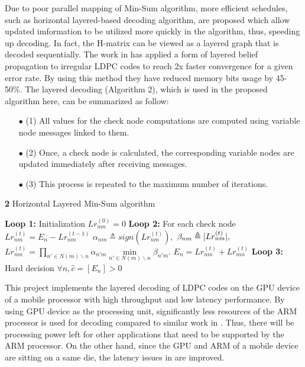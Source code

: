 \documentclass[10pt,a4paper]{article}
\DeclarePairedDelimiter\abs{\lvert}{\rvert}%
\begin{document}
Due to poor parallel mapping of Min-Sum algorithm, more efficient schedules, such as horizontal layered-based decoding algorithm, are proposed which allow updated imformation to be utilized more quickly in the algorithm, thus, speeding up decoding\cite{art_layered0, art_layered1}. In fact, the H-matrix can be viewed as a layered graph that is decoded sequentially. The work in \cite{art_gpu_0} has applied a form of layered belief propagation to irregular LDPC codes to reach 2x faster convergence for a given error rate. By using this method they have reduced memory bits usage by 45-50\%. The layered decoding (Algorithm 2), which is used in the proposed algorithm here, can be summarized as follow:
\begin{enumerate}
\item[$\bullet$] (1) All values for the check node computations are computed using variable node messages linked to them.
\item[$\bullet$] (2) Once, a check node is calculated, the corresponding variable nodes are updated immediately after receiving messages.
\item[$\bullet$] (3) This process is repeated to the maximum number of iterations.
\end{enumerate}
\noindent
\begin{algorithm}[H]
\renewcommand\thealgorithm{}
\caption{\textbf{2} Horizontal Layered Min-Sum algorithm}\label{algorithm2}
\begin{algorithmic}[1]
\STATE \textbf{Loop 1:} Initialization
\STATE
$Lr_{mn}^{(0)}=0$%
\ENDFOR
{}
\STATE \textbf{Loop 2:} For each check node
\STATE$Lr_{nm}^{(t)}=E_n - Lr_{nm}^{(t-1)}$
\ENDFOR
{}
\STATE $\alpha_{nm} \triangleq sign(Lr_{nm}^{(t)}),$
\STATE $\beta_{nm} \triangleq \abs{Lr_{nm}^{(t)}},$
\STATE $Lr_{mn}^{(t)} = \prod\limits_{n' \in N(m)\backslash n} \alpha_{n'm} \min\limits_{n' \in N(m)\backslash n} \beta_{n'm}.$
\ENDFOR
{}
\STATE$E_n = Lr_{nm}^{(t)}+Lr_{mn}^{(t)}$
\ENDFOR
\ENDFOR
\STATE \textbf{Loop 3:} Hard decision
\STATE $\forall n, \hat{c}=[E_n]>0$
\ENDFOR
\ENDFOR %
\end{algorithmic}
\addtocounter{algorithm}{-1}
\end{algorithm}
This project implements the layered decoding of LDPC codes on the GPU device of a mobile processor with high throughput and low latency performance. By using GPU device as the processing unit, significantly less resources of the ARM processor is used for decoding compared to similar work in \cite{art_neon}. Thus, there will be processing power left for other applications that need to be supported by the ARM processor. On the other hand, since the GPU and ARM of a mobile device are sitting on a same die, the latency issues in \cite{art_gpu_0} are improved.
\end{document}
